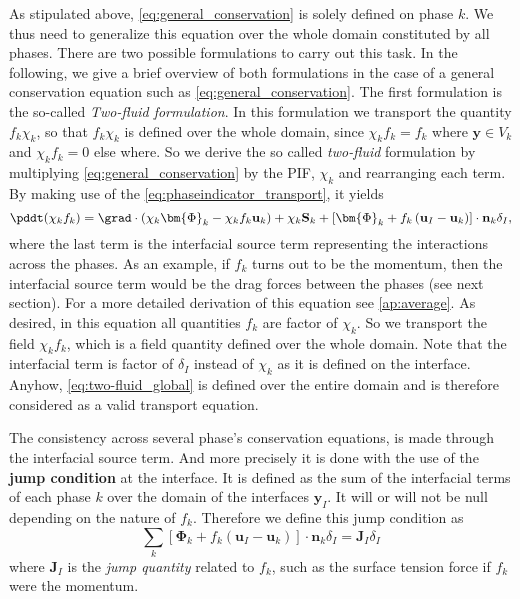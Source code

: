As stipulated above, \ref{eq:general_conservation} is solely defined on phase $k$.
We thus need to generalize this equation over the whole domain constituted by all phases.  
There are two possible formulations to carry out this task.
In the following, we give a brief overview of both formulations in the case of a general conservation equation such as \ref{eq:general_conservation}.
The first formulation is the so-called \textit{Two-fluid formulation}.
In this formulation we transport the quantity $f_k\chi_k$, so that $f_k\chi_k$ is defined over the whole domain, since $\chi_k f_k = f_k$ where $\textbf{y} \in V_k$ and $\chi_k f_k = 0$ else where.
So we derive the so called \textit{two-fluid} formulation by multiplying \ref{eq:general_conservation} by the PIF, $\chi_k$ and rearranging each term. 
By making use of the \ref{eq:phaseindicator_transport}, it yields  
\begin{equation}
    \pddt (\chi_k f_k)
    = \grad \cdot (\chi_k \bm{\Phi}_k - \chi_k f_k \textbf{u}_k)
    + \chi_k \textbf{S}_k
    + \left[
        \bm{\Phi}_k 
        + f_k 
        \left(
            \textbf{u}_I
            - \textbf{u}_k
        \right) 
    \right]
    \cdot \textbf{n}_k \delta_I, 
    \label{eq:two-fluid_global}
\end{equation}
where the last term is the interfacial source term representing the interactions across the phases. 
As an example, if $f_k$ turns out to be the momentum, then the interfacial source term would be the drag forces between the phases (see next section). 
For a more detailed derivation of this equation see \ref{ap:average}.
As desired, in this equation all quantities $f_k$ are factor of $\chi_k$. 
So we transport the field $\chi_k f_k$, which is a field quantity defined over the whole domain. 
Note that the interfacial term is factor of $\delta_I$ instead of $\chi_k$ as it is defined on the interface.
Anyhow, \ref{eq:two-fluid_global} is defined over the entire domain and is therefore considered as a valid transport equation. 

The consistency across several phase's conservation equations, is made through the interfacial source term.  
And more precisely it is done with the use of the \textbf{jump condition} at the interface.
It is defined as the sum of the interfacial terms of each phase $k$ over the domain of the interfaces $\textbf{y}_I$. 
It will or will not be null depending on the nature of $f_k$. 
Therefore we define this jump condition as
\begin{equation}
    \sum_k 
    \left[
        \bm{\Phi}_k 
        + f_k 
        \left(
            \textbf{u}_I
            - \textbf{u}_k
        \right) 
    \right]
    \cdot \textbf{n}_k\delta_I
    = \textbf{J}_I\delta_I
    \label{eq:general_jump}
\end{equation}
where $\textbf{J}_I$ is the \textit{jump quantity} related to $f_k$, such as the surface tension force if $f_k$ were the momentum.

